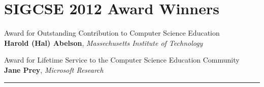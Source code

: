 
{\centering
     \section*{SIGCSE 2012 Award Winners}
}

\noindent Award for Outstanding Contribution to Computer Science Education  \\
\hspace*{5em}\textbf{Harold (Hal) Abelson}, \textit{Massechusetts Institute of Technology}

\noindent Award for Lifetime Service to the Computer Science Education Community \\
\hspace*{5em}\textbf{Jane Prey}, \textit{Microsoft Research}


\noindent\rule{5in}{0.02cm}


